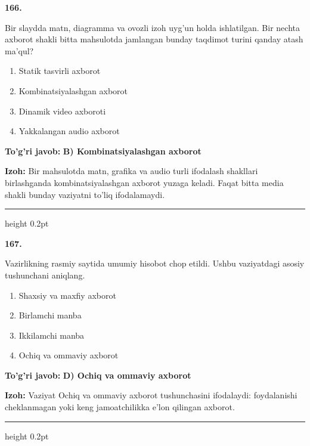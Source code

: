 \documentclass[10pt,a4paper,oneside]{article}
\begin{document}
\noindent\textbf{\color{ink}166.}
\par
Bir slaydda matn, diagramma va ovozli izoh uyg'un holda ishlatilgan. Bir nechta axborot shakli bitta mahsulotda jamlangan bunday taqdimot turini qanday atash ma'qul?
\begin{enumerate}[label=\Alph*),leftmargin=9mm]
\item Statik tasvirli axborot
\item Kombinatsiyalashgan axborot
\item Dinamik video axboroti
\item Yakkalangan audio axborot
\end{enumerate}
\begin{tcolorbox}[enhanced,breakable,colback=teal!4,colframe=teal!50!black,boxrule=0.5pt,arc=1.1mm,left=3mm,right=3mm,top=1.7mm,bottom=1.7mm,before skip=2mm,after skip=2mm]
\textbf{\color{teal}To'g'ri javob:} \textbf{B) Kombinatsiyalashgan axborot}
\par\smallskip
\textbf{Izoh:} Bir mahsulotda matn, grafika va audio turli ifodalash shakllari birlashganda kombinatsiyalashgan axborot yuzaga keladi. Faqat bitta media shakli bunday vaziyatni to'liq ifodalamaydi.
\end{tcolorbox}
\vspace{2mm}\hrule height 0.2pt \vspace{3mm}

\noindent\textbf{\color{ink}167.}
\par
Vazirlikning rasmiy saytida umumiy hisobot chop etildi. Ushbu vaziyatdagi asosiy tushunchani aniqlang.
\begin{enumerate}[label=\Alph*),leftmargin=9mm]
\item Shaxsiy va maxfiy axborot
\item Birlamchi manba
\item Ikkilamchi manba
\item Ochiq va ommaviy axborot
\end{enumerate}
\begin{tcolorbox}[enhanced,breakable,colback=teal!4,colframe=teal!50!black,boxrule=0.5pt,arc=1.1mm,left=3mm,right=3mm,top=1.7mm,bottom=1.7mm,before skip=2mm,after skip=2mm]
\textbf{\color{teal}To'g'ri javob:} \textbf{D) Ochiq va ommaviy axborot}
\par\smallskip
\textbf{Izoh:} Vaziyat Ochiq va ommaviy axborot tushunchasini ifodalaydi: foydalanishi cheklanmagan yoki keng jamoatchilikka e'lon qilingan axborot.
\end{tcolorbox}
\vspace{2mm}\hrule height 0.2pt \vspace{3mm}
\end{document}
